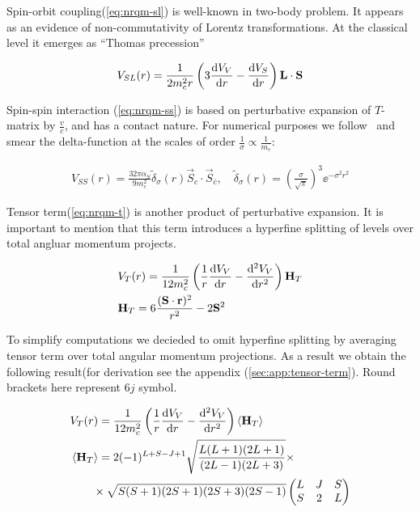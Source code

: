 Spin-orbit coupling(\cref{eq:nrqm-sl}) is well-known in two-body problem. It appears as an evidence of non-commutativity of Lorentz transformations. At the classical level it emerges as ``Thomas precession''~\cite{thomas}

\begin{align} \label{eq:nrqm-sl}
    V_{SL}(r) = \frac{1}{2 m_c^2 r} \left( 3 \dv{V_V}{r} - \dv{V_S}{r} \right) \mathbf{L} \cdot \mathbf{S}
\end{align}

Spin-spin interaction (\cref{eq:nrqm-ss}) is based on perturbative expansion of $T$-matrix by $\frac{v}{c}$, and has a contact nature. For numerical purposes we follow~\cite{gbs-model} and smear the delta-function at the scales of order $\frac{1}{\sigma} \propto \frac{1}{m_c}$:

\begin{align} \label{eq:nrqm-ss}
    V_{SS}(r) = \frac{32 \pi \alpha_S}{9 m_c^2} \tilde{\delta}_\sigma(r) \vec{S}_c \cdot \vec{S}_{\bar{c}},\quad \tilde{\delta}_\sigma(r) = \left(\frac{\sigma}{\sqrt{\pi}}\right)^3 \ee^{-\sigma^2 r^2}
\end{align}

Tensor term(\cref{eq:nrqm-t}) is another product of perturbative expansion. It is important to mention that this term introduces a hyperfine splitting of levels over total angluar momentum projects.

\begin{align} \label{eq:nrqm-t}
    &V_T(r) = \frac{1}{12 m_c^2} \left( \frac{1}{r} \dv{V_V}{r} - \dv[2]{V_V}{r} \right) \mathbf{H}_T \\
    &\mathbf{H}_T = 6\frac{(\mathbf{S} \cdot \mathbf{r})^2}{r^2} - 2\mathbf{S}^2
\end{align}

To simplify computations we decieded to omit hyperfine splitting by averaging tensor term over total angular momentum projections. As a result we obtain the following result(for derivation see the appendix (\cref{sec:app:tensor-term}). Round brackets here represent $6j$ symbol.

\begin{align}
    &V_T(r) = \frac{1}{12 m_c^2} \left( \frac{1}{r} \dv{V_V}{r} - \dv[2]{V_V}{r} \right) \left<\mathbf{H}_T\right> \\
    &\left<\mathbf{H}_T\right> = 2 (-1)^{L+S-J+1} \sqrt{\frac{L(L+1)(2L+1)}{(2L-1)(2L+3)}} \times \nonumber \\
    &\qquad \times \sqrt{S(S+1)(2S+1)(2S+3)(2S-1)} \left( \begin{matrix}
                                                L & J & S \\
                                                S & 2 & L
                                              \end{matrix} \right)
\end{align}

